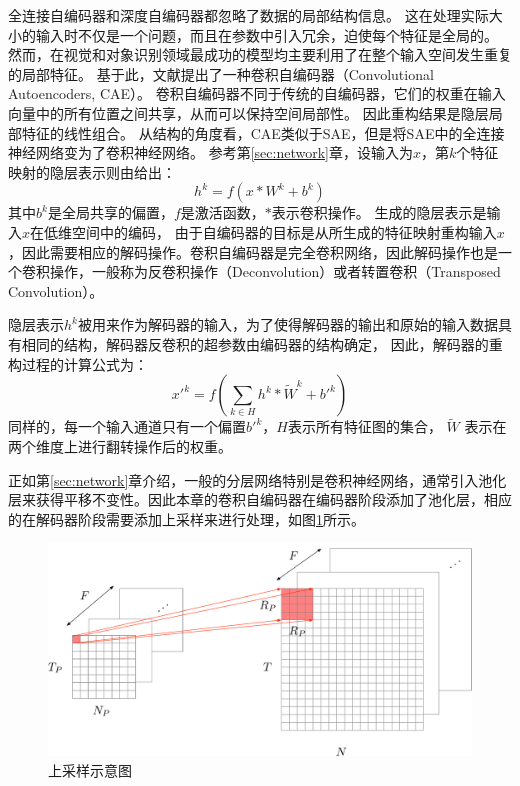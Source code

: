 全连接自编码器和深度自编码器都忽略了数据的局部结构信息。
这在处理实际大小的输入时不仅是一个问题，而且在参数中引入冗余，迫使每个特征是全局的。
然而，在视觉和对象识别领域最成功的模型均主要利用了在整个输入空间发生重复的局部特征。
基于此，文献\cite{masci2011stacked}提出了一种卷积自编码器（Convolutional Autoencoders, CAE）。
卷积自编码器不同于传统的自编码器，它们的权重在输入向量中的所有位置之间共享，从而可以保持空间局部性。
因此重构结果是隐层局部特征的线性组合。
从结构的角度看，CAE类似于SAE，但是将SAE中的全连接神经网络变为了卷积神经网络。
参考第\ref{sec:network}章，设输入为$x$，第$k$个特征映射的隐层表示则由给出：
\begin{equation}
	h^k=f(x*W^k+b^k)
	\label{equ:cae1}
\end{equation}
其中$b^k$是全局共享的偏置，$f$是激活函数，$*$表示卷积操作。
生成的隐层表示是输入$x$在低维空间中的编码，
由于自编码器的目标是从所生成的特征映射重构输入$x$，因此需要相应的解码操作。卷积自编码器是完全卷积网络，因此解码操作也是一个卷积操作，一般称为反卷积操作（Deconvolution）或者转置卷积（Transposed Convolution）。

隐层表示$h^k$被用来作为解码器的输入，为了使得解码器的输出和原始的输入数据具有相同的结构，解码器反卷积的超参数由编码器的结构确定，
因此，解码器的重构过程的计算公式为：
\begin{equation}
	x'^k=f(\sum_{k \in H}h^k * \tilde{W}^k + b'^k)
	\label{equ:cae2}
\end{equation}
同样的，每一个输入通道只有一个偏置$b'^k$，$H$表示所有特征图的集合，
$\tilde{W}$ 表示在两个维度上进行翻转操作后的权重。


正如第\ref{sec:network}章介绍，一般的分层网络特别是卷积神经网络，通常引入池化层来获得平移不变性。因此本章的卷积自编码器在编码器阶段添加了池化层，相应的在解码器阶段需要添加上采样来进行处理，如图\ref{fig:unpool}所示。

\begin{figure}[hbt]
	\centering
	\includegraphics[width=13.5cm]{figures/AE/unpool}
	\caption{上采样示意图}
	\label{fig:unpool}
\end{figure}

